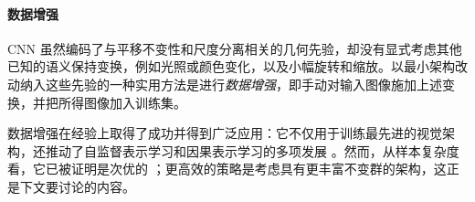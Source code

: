 \paragraph{数据增强}
CNN 虽然编码了与平移不变性和尺度分离相关的几何先验，却没有显式考虑其他已知的语义保持变换，例如光照或颜色变化，以及小幅旋转和缩放。以最小架构改动纳入这些先验的一种实用方法是进行\emph{数据增强}，即手动对输入图像施加上述变换，并把所得图像加入训练集。

数据增强在经验上取得了成功并得到广泛应用：它不仅用于训练最先进的视觉架构，还推动了自监督表示学习和因果表示学习的多项发展 \citep{chen2020simple,grill2020bootstrap,mitrovic2020representation}。然而，从样本复杂度看，它已被证明是次优的 \citep{mei2021learning}；更高效的策略是考虑具有更丰富不变群的架构，这正是下文要讨论的内容。






